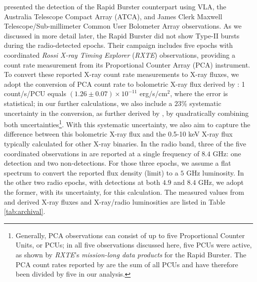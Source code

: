 \documentclass[fleqn,usenatbib]{mnras}
\begin{document}
\citet{moore2000} presented the detection of the Rapid Burster counterpart using VLA, the Australia Telescope Compact Array (ATCA), and James Clerk Maxwell Telescope/Sub-millimeter Common User Bolometer Array observations. As we discussed in more detail later, the Rapid Burster did not show Type-II bursts during the radio-detected epochs. Their campaign includes five epochs with coordinated \textit{Rossi X-ray Timing Explorer} (\textit{RXTE}) observations, providing a count rate measurement from its Proportional Counter Array (PCA) instrument. To convert these reported X-ray count rate measurements to X-ray fluxes, we adopt the conversion of PCA count rate to bolometric X-ray flux derived by \citet{bagnoli2015}: 1 count/s/PCU equals $(1.26 \pm 0.07)\times10^{-11}$ erg/s/cm$^2$, where the error is statistical; in our further calculations, we also include a $23$\% systematic uncertainty in the conversion, as further derived by \citet{bagnoli2015}, by quadratically combining both uncertainties\footnote{Generally, PCA observations can consist of up to five Proportional Counter Units, or PCUs; in all five observations discussed here, five PCUs were active, as shown by \textit{RXTE}'s \textit{mission-long data products} for the Rapid Burster. The PCA count rates reported by \citet{moore2000} are the sum of all PCUs and have therefore been divided by five in our analysis.}. With this systematic uncertainty, we also aim to capture the difference between this bolometric X-ray flux and the 0.5-10 keV X-ray flux typically calculated for other X-ray binaries. In the radio band, three of the five coordinated observations in \citet{moore2000} are reported at a single frequency of $8.4$ GHz: one detection and two non-detections. For those three epochs, we assume a flat spectrum to convert the reported flux density (limit) to a $5$ GHz luminosity. In the other two radio epochs, with detections at both $4.9$ and $8.4$ GHz, we adopt the former, with its uncertainty, for this calculation. The measured values from \citet{moore2000} and derived X-ray fluxes and X-ray/radio luminosities are listed in Table \ref{tab:archival}. 
\end{document}
